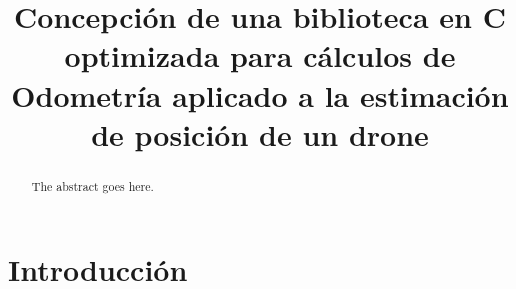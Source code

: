 \documentclass[conference]{IEEEtran}
\begin{document}
%
\title{
  Concepción de una biblioteca en C optimizada para cálculos
  de Odometría aplicado a la estimación de posición de un drone
}


\author{
  \and
}



\maketitle



\begin{abstract}
The abstract goes here.
\end{abstract}


%
\IEEEpeerreviewmaketitle


\section{Introducción}

\end{document}
